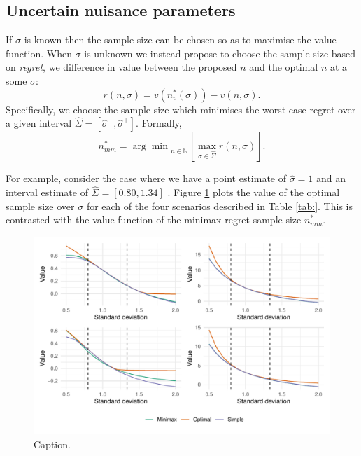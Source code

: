 \documentclass[sagev, Crown]{sagej}
\begin{document}
\subsection{Uncertain nuisance parameters}

If $\sigma$ is known then the sample size can be chosen so as to maximise the value function. When $\sigma$ is unknown we instead propose to choose the sample size based on \emph{regret}, we difference in value between the proposed $n$ and the optimal $n$ at a some $\sigma$:
$$
r(n, \sigma) = v(n^*_v(\sigma)) - v(n, \sigma).
$$ 
Specifically, we choose the sample size which minimises the worst-case regret over a given interval $\hat{\Sigma} = [\hat{\sigma}^-, \hat{\sigma}^+]$. Formally, 
$$
n^*_{mm} = {\arg\min}_{n \in \mathbb{N}} \left[ \max_{\sigma \in \hat{\Sigma}} r(n, \sigma) \right].
$$

For example, consider the case where we have a point estimate of $\hat{\sigma} = 1$ and an interval estimate of $\hat{\Sigma} = [0.80, 1.34]$ . Figure \ref{fig:p2} plots the value of the optimal sample size over $\sigma$ for each of the four scenarios described in Table \ref{tab:}. This is contrasted with the value function of the minimax regret sample size $n_{mm}^*$. 

\begin{figure}
\centering
\includegraphics[scale=0.7]{./figures/p2}
\caption{Caption.}
\label{fig:p2}
\end{figure}
\end{document}
